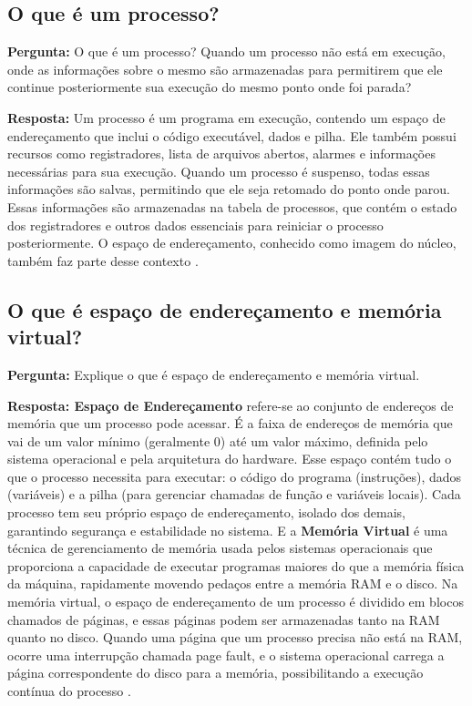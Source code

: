 \documentclass{article}
\begin{document}
\subsection{O que é um processo?}
\textbf{Pergunta:} O que é um processo? Quando um processo não está em execução, onde as informações sobre o mesmo são armazenadas para permitirem que ele continue posteriormente sua execução do mesmo ponto onde foi parada?\newline

\textbf{Resposta:} Um processo é um programa em execução, contendo um espaço de endereçamento que inclui o código executável, dados e pilha. Ele também possui recursos como registradores, lista de arquivos abertos, alarmes e informações necessárias para sua execução. Quando um processo é suspenso, todas essas informações são salvas, permitindo que ele seja retomado do ponto onde parou. Essas informações são armazenadas na tabela de processos, que contém o estado dos registradores e outros dados essenciais para reiniciar o processo posteriormente. O espaço de endereçamento, conhecido como imagem do núcleo, também faz parte desse contexto \cite{tanenbaum2021}.

\subsection{O que é espaço de endereçamento e memória virtual?}
\textbf{Pergunta:} Explique o que é espaço de endereçamento e memória virtual.\newline

\textbf{Resposta: Espaço de Endereçamento} refere-se ao conjunto de endereços de memória que um processo pode acessar. É a faixa de endereços de memória que vai de um valor mínimo (geralmente 0) até um valor máximo, definida pelo sistema operacional e pela arquitetura do hardware. Esse espaço contém tudo o que o processo necessita para executar: o código do programa (instruções), dados (variáveis) e a pilha (para gerenciar chamadas de função e variáveis locais). Cada processo tem seu próprio espaço de endereçamento, isolado dos demais, garantindo segurança e estabilidade no sistema.
E a \textbf{Memória Virtual} é uma técnica de gerenciamento de memória usada pelos sistemas operacionais que proporciona a capacidade de executar programas maiores do que a memória física da máquina, rapidamente movendo pedaços entre a memória RAM e o disco. Na memória virtual, o espaço de endereçamento de um processo é dividido em blocos chamados de páginas, e essas páginas podem ser armazenadas tanto na RAM quanto no disco. Quando uma página que um processo precisa não está na RAM, ocorre uma interrupção chamada page fault, e o sistema operacional carrega a página correspondente do disco para a memória, possibilitando a execução contínua do processo \cite{tanenbaum2021}. 
\end{document}

